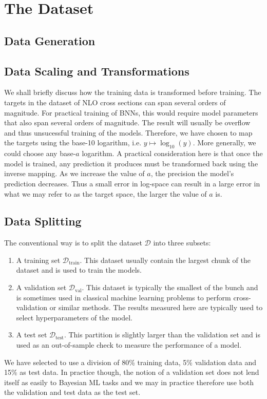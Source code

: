 \section{The Dataset}\label{sec:dataset}
\subsection{Data Generation}


\subsection{Data Scaling and Transformations}
We shall briefly discuss how the training data is transformed before training.
The targets in the dataset of NLO cross sections can span several orders of magnitude. For practical training of BNNs, this would require
model parameters that also span several orders of magnitude. The result will usually be overflow and thus unsucessful training of the models.
Therefore, we have chosen to map the targets using the base-10 logarithm, i.e. $y \mapsto \log_{10}(y)$. More generally, we could choose any base-$a$ logarithm. A practical consideration here is that once the model is trained, any prediction it produces must be transformed back using
the inverse mapping. As we increase the value of $a$, the precision the model's prediction decreases. Thus a small error in log-space 
can result in a large error in what we may refer to as the target space, the larger the value of $a$ is. 

\subsection{Data Splitting}
The conventional way is to split the dataset $\mathcal{D}$ into three subsets: 
\begin{enumerate}
    \item A training set $\mathcal{D}_\text{train}$. This dataset usually contain the largest chunk of the dataset and is used to train the models.
    \item A validation set $\mathcal{D}_\text{val}$. This dataset is typically the smallest of the bunch and is sometimes used in classical machine learning problems to perform cross-validation or similar methods. The results measured here are typically used to select hyperparameters of the model.
    \item A test set $\mathcal{D}_\text{test}$. This partition is slightly larger than the validation set and is used as an out-of-sample check to measure the performance of a model. 
\end{enumerate}
We have selected to use a division of 80\% training data, 5\% validation data and 15\% as test data. In practice though, the notion of a validation set does not lend itself as easily to Bayesian ML tasks and we may in practice therefore use both the validation and test data as the test set.

